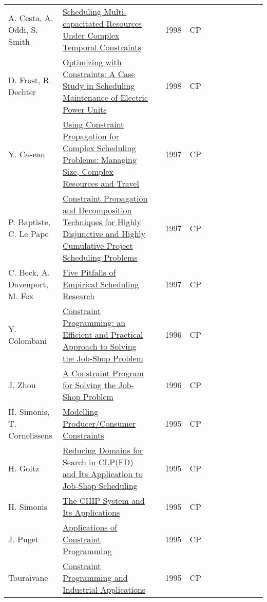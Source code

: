 \documentclass[a4paper]{article}
\begin{document}
{\begin{longtable}{p{3cm}p{6cm}rrcrlcccp{1.5cm}l}
A. Cesta, A. Oddi, S. Smith& \href{papers/CestaOS98.pdf}{Scheduling Multi-capacitated Resources Under Complex Temporal Constraints} & \cite{CestaOS98} & 1998 & CP & & & & & & & \\
D. Frost, R. Dechter& \href{papers/FrostD98.pdf}{Optimizing with Constraints: {A} Case Study in Scheduling Maintenance of Electric Power Units} & \cite{FrostD98} & 1998 & CP & & & & & & & \\
Y. Caseau& \href{papers/Caseau97.pdf}{Using Constraint Propagation for Complex Scheduling Problems: Managing Size, Complex Resources and Travel} & \cite{Caseau97} & 1997 & CP & & & & & & & \\
P. Baptiste, C. Le Pape& \href{papers/BaptisteP97.pdf}{Constraint Propagation and Decomposition Techniques for Highly Disjunctive and Highly Cumulative Project Scheduling Problems} & \cite{BaptisteP97} & 1997 & CP & & & & & & & \\
C. Beck, A. Davenport, M. Fox & \href{papers/BeckDF97.pdf}{Five Pitfalls of Empirical Scheduling Research} & \cite{BeckDF97} & 1997 & CP & & & & & & & \\
Y. Colombani & \href{papers/Colombani96.pdf}{Constraint Programming: an Efficient and Practical Approach to Solving the Job-Shop Problem} & \cite{Colombani96} & 1996 & CP & & & & & & & \\
J. Zhou & \href{papers/Zhou96.pdf}{A Constraint Program for Solving the Job-Shop Problem} & \cite{Zhou96} & 1996 & CP & & & & & & & \\
H. Simonis, T. Cornelissens & \href{papers/SimonisC95.pdf}{Modelling Producer/Consumer Constraints} & \cite{SimonisC95} & 1995 & CP & & & & & & & \\
H. Goltz & \href{papers/Goltz95.pdf}{Reducing Domains for Search in {CLP(FD)} and Its Application to Job-Shop Scheduling} & \cite{Goltz95} & 1995 & CP & & & & & & & \\
H. Simonis & \href{papers/Simonis95.pdf}{The {CHIP} System and Its Applications} & \cite{Simonis95} & 1995 & CP & & & & & & & \\
J. Puget & \href{papers/Puget95.pdf}{Applications of Constraint Programming} & \cite{Puget95} & 1995 & CP & & & & & & & \\
Toura{\"{\i}}vane & \href{papers/Touraivane95.pdf}{Constraint Programming and Industrial Applications} & \cite{Touraivane95} & 1995 & CP & & & & & & & \\


\end{longtable}}
\end{document}
